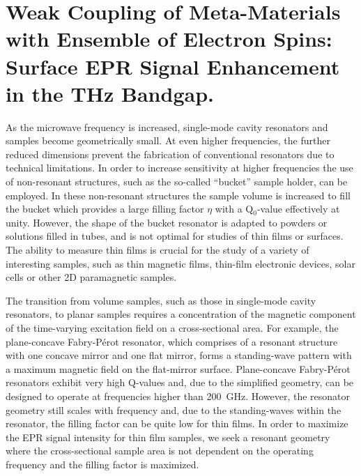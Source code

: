 \chapter[Weak Coupling of Meta-Materials for FD-FT THz EPR]{Weak Coupling of Meta-Materials with Ensemble of Electron Spins: Surface EPR Signal Enhancement in the THz Bandgap.}


As the microwave frequency is increased, single-mode cavity resonators and samples become geometrically small. At even higher frequencies, the further reduced dimensions prevent the fabrication of conventional resonators due to technical limitations. In order to increase sensitivity at higher frequencies the use of non-resonant structures, such as the so-called ``bucket'' sample holder, can be employed. In these non-resonant structures the sample volume is increased to fill the bucket which provides a large filling factor $\eta$ with a Q$_0$-value effectively at unity. \cite{grinbergVHF} However, the shape of the bucket resonator is adapted to powders or solutions filled in tubes, and is not optimal for studies of thin films or surfaces. The ability to measure thin films is crucial for the study of a variety of interesting samples, such as thin magnetic films, thin-film electronic devices, solar cells or other 2D paramagnetic samples.

The transition from volume samples, such as those in single-mode cavity resonators, to planar samples requires a concentration of the magnetic component of the time-varying excitation field on a cross-sectional area. For example, the plane-concave Fabry-P\'{e}rot resonator, which comprises of a resonant structure with one concave mirror and one flat mirror, forms a standing-wave pattern with a maximum magnetic field on the flat-mirror surface. \cite{grinbergVHF} Plane-concave Fabry-P\'{e}rot resonators exhibit very high Q-values and, due to the simplified geometry, can be designed to operate at frequencies higher than 200~GHz. \cite{Clarke1982Fabry, BraakmanFabry} However, the resonator geometry still scales with frequency and, due to the standing-waves within the resonator, the filling factor can be quite low for thin films. In order to maximize the EPR signal intensity for thin film samples, we seek a resonant geometry where the cross-sectional sample area is not dependent on the operating frequency and the filling factor is maximized. 

